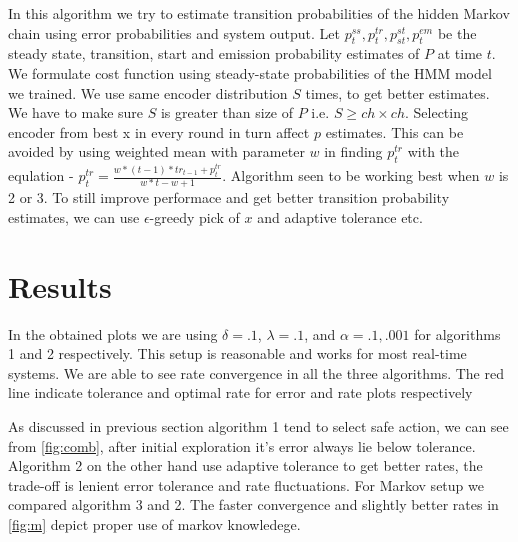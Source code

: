 \documentclass[BTech,thesis]{iitmdiss}
\begin{document}
In this algorithm we try to estimate transition probabilities of the hidden Markov chain using error probabilities and system output. Let $p^{ss}_{t}, p^{tr}_{t}, p^{st}_{st}, p^{em}_{t}$ be the steady state, transition, start and emission probability estimates of $P$ at time $t$. We formulate cost function using steady-state probabilities of the HMM model we trained. We use same encoder distribution $S$ times, to get better estimates. We have to make sure $S$ is greater than size of $P$ i.e. $S \geq ch\times ch$. Selecting encoder from best x in every round in turn affect $p$ estimates. This can be avoided by using weighted mean with parameter $w$ in finding $p^{tr}_{t}$ with the equlation - $ p^{tr}_{t} = \frac{w*(t-1)*{tr}_{t-1} +  p^{tr}_{t}}{w*t - w + 1} $. Algorithm seen to be  working best when $w$ is 2 or 3. To still improve performace and get better transition probability estimates, we can use $\epsilon$-greedy pick of $x$ and adaptive tolerance etc.

\section{Results}

In the obtained plots we are using $\delta=.1$, $\lambda=.1$, and $\alpha=.1,.001$ for algorithms 1 and 2 respectively. This setup is reasonable and works for most real-time systems. We are able to see rate convergence in all the three algorithms. The red line indicate tolerance and optimal rate for error and rate plots respectively

As discussed in previous section algorithm 1 tend to select safe action, we can see from \ref{fig:comb}, after initial exploration it's error always lie below tolerance. Algorithm 2 on the other hand use adaptive tolerance to get better rates, the trade-off is lenient error tolerance and rate fluctuations. For Markov setup we compared algorithm 3 and 2. The faster convergence and slightly better rates in \ref{fig:m} depict proper use of markov knowledege.
\end{document}
